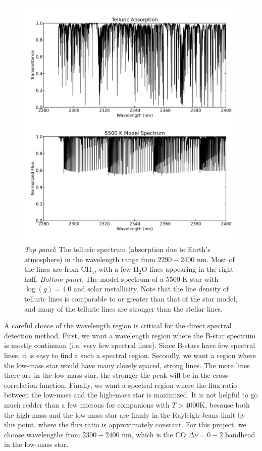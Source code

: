 \begin{figure}[t]
  \centering
  \includegraphics[width=\columnwidth]{Figures/paper1_fig2.pdf}
  \caption{\emph{Top panel}: The telluric spectrum (absorption due to Earth's
    atmosphere) in the wavelength range from $2290-2400$ nm. Most of the lines are
    from CH$_4$, with a few H$_2$O lines appearing in the right
    half. \emph{Bottom panel}: The model spectrum of a 5500 K star
    with $\log (g) = 4.0$ and solar metallicity. Note that the line density of telluric
    lines is comparable to or greater than that of the star model, and many of the
    telluric lines are stronger than the stellar lines.}
  \label{paper1_fig:telluric}
\end{figure}

A careful choice of the wavelength region is critical for the direct spectral 
detection method. First, we want a wavelength region where the B-star spectrum
is mostly continuum (i.e. very few spectral lines). Since B-stars have few spectral lines, it is
easy to find a such a spectral region. Secondly, we want a region where the low-mass star
would have many closely spaced, strong lines. The more lines there are
in the low-mass star, the stronger the peak will be in the
cross-correlation function. Finally, we want a spectral region where the
flux ratio between the low-mass and the high-mass star is maximized.
It is not helpful to go much redder than a few microns for  
companions with $T>4000$K, because both the high-mass and
the low-mass star are firmly in the Rayleigh-Jeans limit by this
point, where the flux ratio is approximately constant. For this project,
we choose wavelengths from $2300-2400$ nm, which is the CO $\Delta\nu = 0-2$
bandhead in the low-mass star. 

